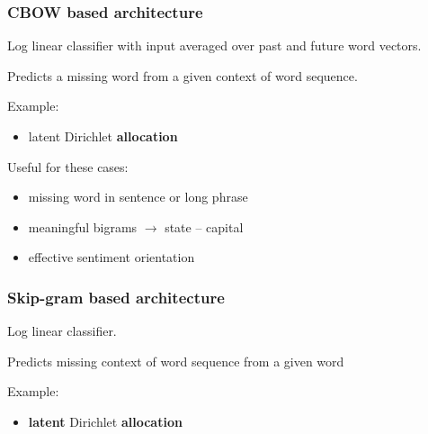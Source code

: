 \documentclass{beamer}   %
\begin{document}

\begin{frame}[t]
\frametitle{CBOW based architecture}
    Log linear classifier with input averaged over past and future word vectors. \par
    Predicts a missing word from a given context of word sequence. \par
    \vspace{1em} 
    Example: \par
    \begin{itemize}
        \item latent Dirichlet {\bf allocation} 
    \end{itemize}
    \vspace{2em} 
  
    Useful for these cases: \par
    \begin{itemize}
        \item missing word in sentence or long phrase 
        \item meaningful bigrams $\rightarrow$ state -- capital
        \item effective sentiment orientation
    \end{itemize}
\end{frame}


\begin{frame}[t]
\frametitle{Skip-gram based architecture}
    Log linear classifier. \par
    Predicts missing context of word sequence from a given word \par
    \vspace{1em} 
    Example: \par
    \begin{itemize}
        \item {\bf latent} Dirichlet {\bf allocation}
    \end{itemize}
\end{frame}

\end{document}
